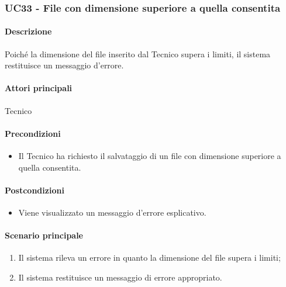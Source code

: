 \subsubsection{UC33 - File con dimensione superiore a quella consentita}\label{UC33}
\paragraph*{Descrizione}
Poiché la dimensione del file inserito dal Tecnico supera i limiti, il sistema restituisce un messaggio d'errore.

\paragraph*{Attori principali}
Tecnico

\paragraph*{Precondizioni}
\begin{itemize}
  \item Il Tecnico ha richiesto il salvataggio di un file con dimensione superiore a quella consentita.
\end{itemize}

\paragraph*{Postcondizioni}
\begin{itemize}
  \item Viene visualizzato un messaggio d'errore esplicativo.
\end{itemize}

\paragraph*{Scenario principale}
\begin{enumerate}
  \item Il sistema rileva un errore in quanto la dimensione del file supera i limiti;
  \item Il sistema restituisce un messaggio di errore appropriato.
\end{enumerate}
